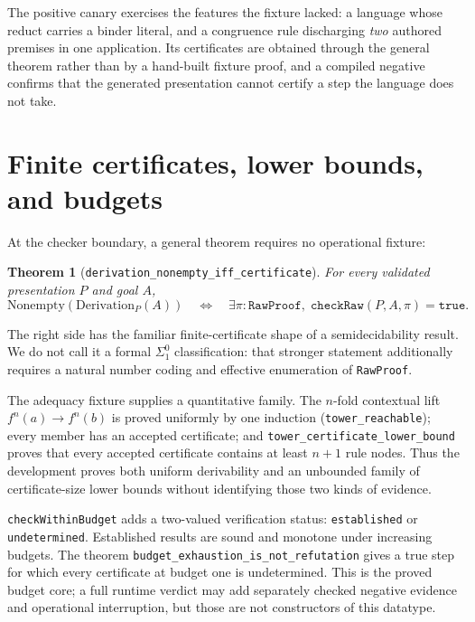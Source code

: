 \documentclass[]{article}
\newtheorem{theorem}{Theorem}
\theoremstyle{remark}
\newcommand{\code}[1]{\texttt{#1}}
\begin{document}
The positive canary exercises the features the fixture lacked: a language
whose reduct carries a binder literal, and a congruence rule discharging
\emph{two} authored premises in one application.  Its certificates are
obtained through the general theorem rather than by a hand-built fixture
proof, and a compiled negative confirms that the generated presentation
cannot certify a step the language does not take.

\section{Finite certificates, lower bounds, and budgets}
\label{sec:certificates}

At the checker boundary, a general theorem requires no operational fixture:

\begin{theorem}[\code{derivation\_nonempty\_iff\_certificate}]
For every validated presentation $P$ and goal $A$,
\[
  \mathrm{Nonempty}(\mathrm{Derivation}_P(A))
  \quad\Longleftrightarrow\quad
  \exists \pi:\code{RawProof},\; \code{checkRaw}(P,A,\pi)=\code{true}.
\]
\end{theorem}

The right side has the familiar finite-certificate shape of a
semidecidability result.  We do not call it a formal $\Sigma^0_1$
classification: that stronger statement additionally requires a natural
number coding and effective enumeration of \code{RawProof}.

The adequacy fixture supplies a quantitative family.  The $n$-fold contextual
lift $f^n(a)\to f^n(b)$ is proved uniformly by one induction
(\code{tower\_reachable}); every member has an accepted certificate; and
\code{tower\_certificate\_lower\_bound} proves that every accepted
certificate contains at least $n+1$ rule nodes.  Thus the development proves
both uniform derivability and an unbounded family of certificate-size lower
bounds without identifying those two kinds of evidence.

\code{checkWithinBudget} adds a two-valued verification status:
\code{established} or \code{undetermined}.  Established results are sound and
monotone under increasing budgets.  The theorem
\code{budget\_exhaustion\_is\_not\_refutation} gives a true step for which
every certificate at budget one is undetermined.  This is the proved budget
core; a full runtime verdict may add separately checked negative evidence and
operational interruption, but those are not constructors of this datatype.
\end{document}
